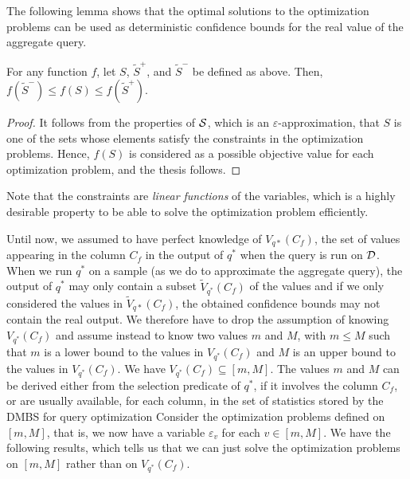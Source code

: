 The following lemma shows that the optimal solutions to the optimization problems
can be used as deterministic confidence bounds for the real value of the
aggregate query.

\begin{lemma}\label{lem:confbounds}
  For any function $f$, let $S$, $\tilde{S}^+$, and $\tilde{S}^-$ be defined as
  above. Then, $f(\tilde{S}^-)\le f(S)\le f(\tilde{S}^+)$.
\end{lemma}
\begin{proof}
  It follows from the properties of ${\cal S}$, which is an
  $\varepsilon$-approximation, that $S$ is one of the sets whose elements
  satisfy the constraints in the optimization problems. Hence, $f(S)$ is
  considered as a possible objective value for  each optimization problem, and
  the thesis follows.
\end{proof}

Note that the constraints are \emph{linear functions} of the variables, which is
a highly desirable property to be able to solve the optimization problem
efficiently. 

Until now, we assumed to have perfect knowledge of $V_{q*}(C_f)$, the set of
values appearing in the column $C_f$ in the output of $q^*$ when the query is
run on ${\cal D}$. When we run $q^*$ on a sample (as we do to approximate the
aggregate query), the output of $q^*$ may only contain a subset
$\tilde{V}_{q^*}(C_f)$ of the values and if we only considered the values in
$\tilde{V}_{q*}(C_f)$, the obtained confidence bounds may not contain the real
output. We therefore have to drop the assumption of knowing $V_{q^*}(C_f)$ and
assume instead to know two values $m$ and $M$, with $m\le M$ such that $m$ is a
lower bound to the values in $V_{q^*}(C_f)$ and $M$ is an upper bound to the
values in $V_{q^*}(C_f)$. We have $V_{q^*}(C_f)\subseteq[m,M]$. The values $m$
and $M$ can be derived either from the selection predicate of $q^*$, if it
involves the column $C_f$, or are usually available, for each column, in the set
of statistics stored by the DMBS for query optimization Consider the optimization
problems defined on $[m,M]$, that is, we now have a variable $\varepsilon_v$ for
each $v\in[m,M]$. 
We have the following results, which tells us that we can just solve
the optimization problems on $[m,M]$ rather than on $V_{q^*}(C_f)$. 


